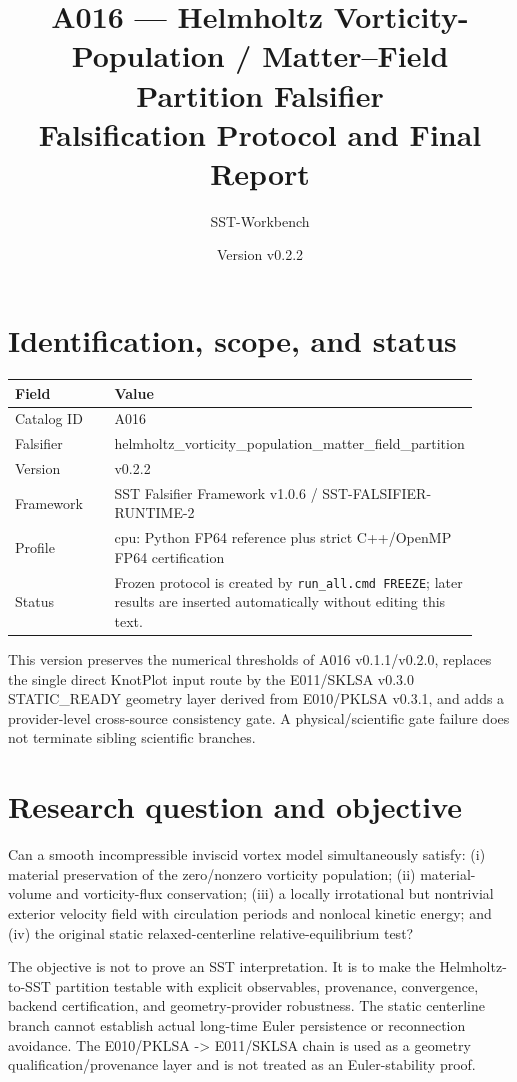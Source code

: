 \documentclass[11pt,a4paper]{article}
\title{A016 --- Helmholtz Vorticity-Population / Matter--Field Partition Falsifier\\Falsification Protocol and Final Report}
\author{SST-Workbench}
\date{Version v0.2.2}
\begin{document}
\maketitle

\section{Identification, scope, and status}
\begin{longtable}{p{0.30\linewidth}p{0.62\linewidth}}
\toprule
Field & Value \\
\midrule
Catalog ID & A016 \\
Falsifier & helmholtz\_vorticity\_population\_matter\_field\_partition \\
Version & v0.2.2 \\
Framework & SST Falsifier Framework v1.0.6 / SST-FALSIFIER-RUNTIME-2 \\
Profile & cpu: Python FP64 reference plus strict C++/OpenMP FP64 certification \\
Status & Frozen protocol is created by \texttt{run\_all.cmd FREEZE}; later results are inserted automatically without editing this text. \\
\bottomrule
\end{longtable}
This version preserves the numerical thresholds of A016 v0.1.1/v0.2.0, replaces the single direct KnotPlot input route by the E011/SKLSA v0.3.0 STATIC\_READY geometry layer derived from E010/PKLSA v0.3.1, and adds a provider-level cross-source consistency gate. A physical/scientific gate failure does not terminate sibling scientific branches.

\section{Research question and objective}
Can a smooth incompressible inviscid vortex model simultaneously satisfy: (i) material preservation of the zero/nonzero vorticity population; (ii) material-volume and vorticity-flux conservation; (iii) a locally irrotational but nontrivial exterior velocity field with circulation periods and nonlocal kinetic energy; and (iv) the original static relaxed-centerline relative-equilibrium test?

The objective is not to prove an SST interpretation. It is to make the Helmholtz-to-SST partition testable with explicit observables, provenance, convergence, backend certification, and geometry-provider robustness. The static centerline branch cannot establish actual long-time Euler persistence or reconnection avoidance. The E010/PKLSA -> E011/SKLSA chain is used as a geometry qualification/provenance layer and is not treated as an Euler-stability proof.
\end{document}
